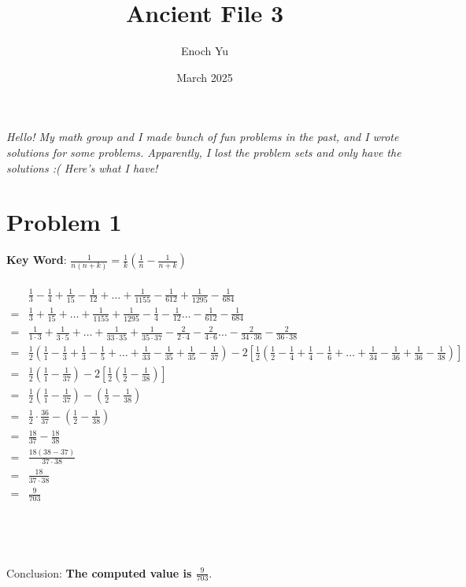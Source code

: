 \documentclass[12pt]{report}
\title{Ancient File 3}
\author{Enoch Yu}
\date{March 2025}
\begin{document}
\maketitle

\begin{center}
\small\em
Hello! My math group and I made bunch of fun problems
in the past, and I wrote solutions for some problems.
Apparently, I lost the problem sets and only have the
solutions :( Here's what I have!
\end{center}

\chapter*{Problem 1}
\textbf{Key Word}: $\frac{1}{n(n+k)}=\frac{1}{k}(\frac{1}{n}-\frac{1}{n+k})$
\\\\
\setlength{\jot}{8pt}
\begin{align*}
&\frac{1}{3}-\frac{1}{4}+\frac{1}{15}-\frac{1}{12}+\dots+\frac{1}{1155}-\frac{1}{612}+\frac{1}{1295}-\frac{1}{684} \\
=& \frac{1}{3}+\frac{1}{15}+\dots+\frac{1}{1155}+\frac{1}{1295}-\frac{1}{4}-\frac{1}{12}\dots-\frac{1}{612}-\frac{1}{684} \\
=& \frac{1}{1\cdot3}+\frac{1}{3\cdot5}+\dots+\frac{1}{33\cdot35}+\frac{1}{35\cdot37}-\frac{2}{2\cdot4}-\frac{2}{4\cdot6}\dots-\frac{2}{34\cdot36}-\frac{2}{36\cdot38} \\
=& \frac{1}{2}(\frac{1}{1}-\frac{1}{3}+\frac{1}{3}-\frac{1}{5}+\dots+\frac{1}{33}-\frac{1}{35}+\frac{1}{35}-\frac{1}{37})-2[\frac{1}{2}(\frac{1}{2}-\frac{1}{4}+\frac{1}{4}-\frac{1}{6}+\dots+\frac{1}{34}-\frac{1}{36}+\frac{1}{36}-\frac{1}{38})] \\
=& \frac{1}{2}(\frac{1}{1}-\frac{1}{37})-2[\frac{1}{2}(\frac{1}{2}-\frac{1}{38})] \\
=& \frac{1}{2}(\frac{1}{1}-\frac{1}{37})-(\frac{1}{2}-\frac{1}{38}) \\
=& \frac{1}{2}\cdot\frac{36}{37}-(\frac{1}{2}-\frac{1}{38}) \\
=& \frac{18}{37}-\frac{18}{38} \\
=& \frac{18(38-37)}{37\cdot38} \\
=& \frac{18}{37\cdot38} \\
=& \frac{9}{703}
\end{align*}
\\\\
\\\\
Conclusion: \textbf{The computed value is $\frac{9}{703}$}.
\end{document}
